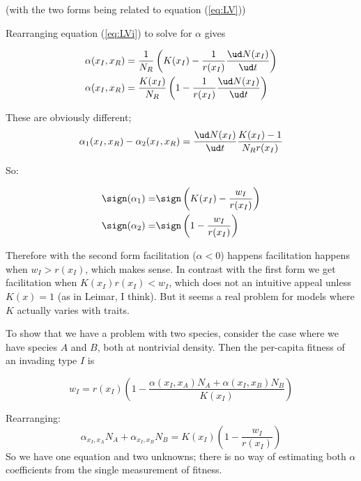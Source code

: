 (with the two forms being related to equation (\ref{eq:LV}))

Rearranging equation (\ref{eq:LVi}) to solve for $\alpha$ gives

\begin{subequations}
  \begin{align}
    \alpha(x_I, x_R) &= \frac{1}{N_R}
    \left(K(x_I) - \frac{1}{r(x_I)}\frac{\ud N(x_I)}{\ud t}\right)\\
    \alpha(x_I, x_R) &= \frac{K(x_I)}{N_R}
    \left(1 - \frac{1}{r(x_I)}\frac{\ud N(x_I)}{\ud t}\right)
  \end{align}
\end{subequations}

These are obviously different;
\begin{equation*}
  \alpha_1(x_I, x_R) - \alpha_2(x_I, x_R) =
  \frac{\ud N(x_I)}{\ud t} \frac{K(x_I) - 1}{N_R r(x_I)}
\end{equation*}

So:

\begin{align*}
  \sign(\alpha_1) =& \sign\left(K(x_I) - \frac{w_I}{r(x_I)}\right)\\
  \sign(\alpha_2) =& \sign\left(1 - \frac{w_I}{r(x_I)}\right)
\end{align*}

Therefore with the second form facilitation ($\alpha < 0$) happens
facilitation happens when $w_I > r(x_I)$, which makes sense.  In
contrast with the first form we get facilitation when $K(x_I) r(x_I) <
w_I$, which does not an intuitive appeal unless $K(x) = 1$ (as in
Leimar, I think).  But it seems a real problem for models where $K$
actually varies with traits.

To show that we have a problem with two species, consider the case
where we have species $A$ and $B$, both at nontrivial density.  Then
the per-capita fitness of an invading type $I$ is

\begin{equation*}
  w_I = r(x_I)\left(1 - \frac{\alpha(x_I, x_A) N_A + \alpha(x_I, x_B) N_B}{K(x_I)}\right)
\end{equation*}

Rearranging:
\begin{equation*}
  \alpha_{x_I, x_A} N_A + \alpha_{x_I, x_B} N_B =
  K(x_I)\left(1 - \frac{w_I}{r(x_I)}\right)
\end{equation*}
So we have one equation and two unknowns; there is no way of
estimating both $\alpha$ coefficients from the single measurement of
fitness.

